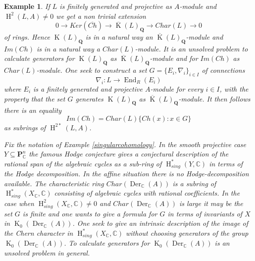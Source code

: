 \documentclass{amsart}
\theoremstyle{plain}
\newtheorem{example}[theorem]{Example}
\theoremstyle{definition}
\theoremstyle{remark}
\numberwithin{equation}{theorem}
\begin{document}
\begin{example} 

If $L$ is finitely generated and projective as ${A}$-module and ${\operatorname{H} }^2(L,{A})\neq 0$ we get a non trivial extension
\[ 0\rightarrow Ker(\overline{Ch})\rightarrow \overline{\operatorname{K}}(L)_{\mathbf{Q} } \rightarrow Char(L) \rightarrow 0 \]
of rings. Hence ${\operatorname{K}}(L)_{\mathbf{Q} }$ is in a natural way an $\overline{\operatorname{K}}(L)_{\mathbf{Q} }$-module and 
$Im(Ch)$ is in a natural way a $Char(L)$-module. It is an unsolved problem to calculate 
generators for ${\operatorname{K}}(L)_{\mathbf{Q} }$ as $\overline{\operatorname{K}}(L)_{\mathbf{Q} }$-module and for $Im(Ch)$ as $Char(L)$-module.
One seek to construct a set $G=\{ E_i, \nabla_i\}_{i\in I}$ of connections
\[ \nabla_i:L\rightarrow {\operatorname{End} }_{R}(E_i)\]
where $E_i$ is a finitely generated and projective ${A}$-module for every $i\in I$,
with the property that the set $G$ generates ${\operatorname{K}}(L)_{\mathbf{Q} }$ as $\overline{\operatorname{K}}(L)_{\mathbf{Q} }$-module.
It then follows there is an equality
\[ Im(Ch)=Char(L)\{ Ch(x): x\in G\}\]
as subrings of ${\operatorname{H} }^{2*}(L,{A})$. 

Fix the notation of Example \ref{singularcohomology}. 
In the smooth projective case $Y\subseteq \mathbf{P}^n_{\mathbb{C} }$ the famous Hodge conjecture gives a conjectural description
of the rational span of the algebraic cycles as a sub-ring of ${\operatorname{H} }^*_{sing}(Y,{\mathbb{C} })$ in terms of the Hodge decomposition. 
In the affine situation there is no Hodge-decomposition available. 
The characteristic ring $Char({\operatorname{Der} }_{\mathbb{C} }(A))$ is a subring of ${\operatorname{H} }^*_{sing}(X_{\mathbb{C} },{\mathbb{C} })$
consisting of algebraic cycles with rational coefficients. In the case when ${\operatorname{H} }^2_{sing}(X_{\mathbb{C} },{\mathbb{C} })\neq 0$ and
$Char({\operatorname{Der} }_{\mathbb{C} }(A))$ is large it may be the set $G$ is finite and one wants to give a formula for $G$ in terms of
invariants of $X$ in ${\operatorname{K}}_0({\operatorname{Der} }_{\mathbb{C} }(A))$. One seek to give an intrinsic description of the image of the Chern character
in ${\operatorname{H} }^*_{sing}(X_{\mathbb{C} },{\mathbb{C} })$ without choosing generators of the group ${\operatorname{K}}_0({\operatorname{Der} }_{\mathbb{C} }(A))$. To calculate
generators for ${\operatorname{K}}_0({\operatorname{Der} }_{\mathbb{C} }(A))$ is an unsolved problem in general.
\end{example}
\end{document}
